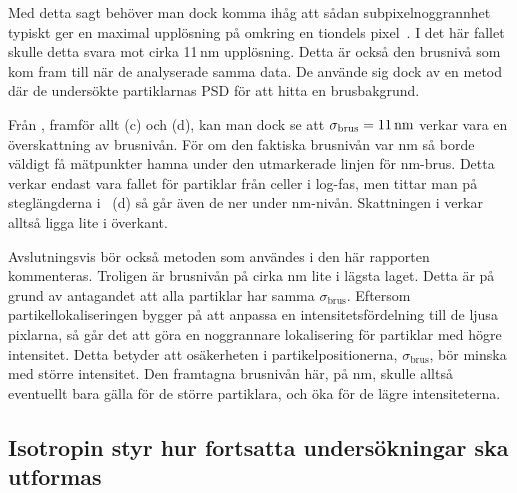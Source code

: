 Med detta sagt behöver man dock komma ihåg att sådan subpixelnoggrannhet typiskt ger en maximal upplösning på omkring en tiondels pixel~\cite{Saunter2010}. I det här fallet skulle detta svara mot cirka 11\,nm upplösning. Detta är också den brusnivå som \cite{Midtveldt_etal2016} kom fram till när de analyserade samma data. De använde sig dock av en metod där de undersökte partiklarnas PSD för att hitta en brusbakgrund. 

Från , framför allt (c) och (d), kan man dock se att $\sigma_\text{brus}=\unit[11]{nm}$ verkar vara en överskattning av brusnivån. För om den faktiska brusnivån var \unit[11]{nm} så borde väldigt få mätpunkter hamna under den utmarkerade linjen för \unit[11]{nm}-brus. Detta verkar endast vara fallet för partiklar från celler i log-fas, men tittar man på steglängderna i ~(d) så går även de ner under \unit[11]{nm}-nivån. Skattningen i \cite{Midtveldt_etal2016} verkar alltså ligga lite i överkant.\footnotemark{}


Avslutningsvis bör också metoden som användes i den här rapporten kommenteras. Troligen är brusnivån på cirka \unit[5]{nm} lite i lägsta laget. Detta är på grund av antagandet att alla partiklar har samma $\sigma_\text{brus}$. Eftersom partikellokaliseringen bygger på att anpassa en intensitetsfördelning till de ljusa pixlarna, så går det att göra en noggrannare lokalisering för partiklar med högre intensitet. Detta betyder att osäkerheten i partikelpositionerna, $\sigma_\text{brus}$, bör minska med större intensitet. Den framtagna brusnivån här, på \unit[5]{nm}, skulle alltså eventuellt bara gälla för de större partiklara, och öka för de lägre intensiteterna.



\subsection{Isotropin styr hur fortsatta undersökningar ska utformas}

